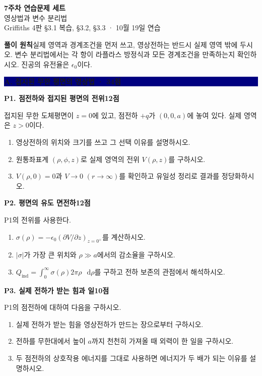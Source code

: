 \documentclass[10pt,a4paper]{article}
\newcommand{\dd}{\mathop{}\!\mathrm{d}}
\newcommand{\problem}[3]{%
  \needspace{0.18\textheight}
  \par\vspace{2.2mm}
  {\large\bfseries\color{navy}#1\hfill{\normalsize\color{blue}#2점}}\par
  \smallskip #3\par
}
\newcommand{\sectionbar}[1]{%
  \par\vspace{2.5mm}
  \colorbox{navy}{\parbox{0.965\linewidth}{\color{white}\bfseries\large #1}}
  \par\vspace{0.5mm}
}
\begin{document}
\begin{center}
  {\LARGE\bfseries\color{navy}7주차 연습문제 세트}\\[1.5mm]
  {\large 영상법과 변수 분리법}\\[1mm]
  {\small Griffiths 4판 §3.1 복습, §3.2, §3.3 · 10월 19일 연습}
\end{center}

\begin{infobox}
\textbf{풀이 원칙}\quad 실제 영역과 경계조건을 먼저 쓰고, 영상전하는 반드시 실제 영역 밖에 두시오. 변수 분리법에서는 각 항이 라플라스 방정식과 모든 경계조건을 만족하는지 확인하시오. 진공의 유전율은 $\epsilon_0$이다.
\end{infobox}

\sectionbar{A. 접지된 무한 평면의 영상법 · 34점}

\problem{P1. 점전하와 접지된 평면의 전위}{12}{%
접지된 무한 도체평면이 $z=0$에 있고, 점전하 $+q$가 $(0,0,a)$에 놓여 있다. 실제 영역은 $z>0$이다.
\begin{enumerate}[label=(\alph*)]
  \item 영상전하의 위치와 크기를 쓰고 그 선택 이유를 설명하시오.
  \item 원통좌표계 $(\rho,\phi,z)$로 실제 영역의 전위 $V(\rho,z)$를 구하시오.
  \item $V(\rho,0)=0$과 $V\to0$ $(r\to\infty)$를 확인하고 유일성 정리로 결과를 정당화하시오.
\end{enumerate}
}

\problem{P2. 평면의 유도 면전하}{12}{%
P1의 전위를 사용한다.
\begin{enumerate}[label=(\alph*)]
  \item $\sigma(\rho)=-\epsilon_0(\partial V/\partial z)_{z=0^+}$를 계산하시오.
  \item $|\sigma|$가 가장 큰 위치와 $\rho\gg a$에서의 감소율을 구하시오.
  \item $Q_{\mathrm{ind}}=\int_0^\infty\sigma(\rho)2\pi\rho\,\dd\rho$를 구하고 전하 보존의 관점에서 해석하시오.
\end{enumerate}
}

\problem{P3. 실제 전하가 받는 힘과 일}{10}{%
P1의 점전하에 대하여 다음을 구하시오.
\begin{enumerate}[label=(\alph*)]
  \item 실제 전하가 받는 힘을 영상전하가 만드는 장으로부터 구하시오.
  \item 전하를 무한대에서 높이 $a$까지 천천히 가져올 때 외력이 한 일을 구하시오.
  \item 두 점전하의 상호작용 에너지를 그대로 사용하면 에너지가 두 배가 되는 이유를 설명하시오.
\end{enumerate}
}
\end{document}

